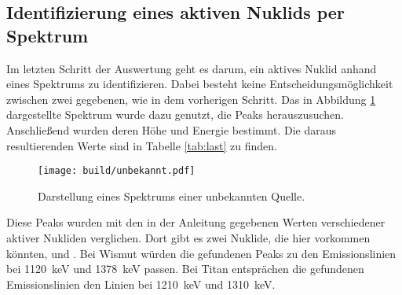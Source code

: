 \subsection{Identifizierung eines aktiven Nuklids per Spektrum}
\label{sec:Nuklidbestimmung}
Im letzten Schritt der Auswertung geht es darum, ein aktives Nuklid anhand eines
Spektrums zu identifizieren. Dabei besteht keine Entscheidungsmöglichkeit zwischen
zwei gegebenen, wie in dem vorherigen Schritt.
Das in Abbildung \ref{plt:unbekannt} dargestellte Spektrum wurde dazu genutzt, die Peaks herauszusuchen.
Anschließend wurden deren Höhe und Energie bestimmt. Die daraus
resultierenden Werte sind in Tabelle \ref{tab:last} zu finden.
\begin{figure}[htb]
  \centering
  \texttt{[image: build/unbekannt.pdf]}
  \caption{Darstellung eines Spektrums einer unbekannten Quelle.}
  \label{plt:unbekannt}
\end{figure}

\FloatBarrier
Diese Peaks wurden mit den in der Anleitung \cite{anleitung} gegebenen Werten
verschiedener aktiver Nukliden verglichen.
Dort gibt es zwei Nuklide, die hier vorkommen könnten,  und
. Bei Wismut würden die gefundenen Peaks zu den Emissionslinien
bei \SI{1120}{\kilo\electronvolt} und \SI{1378}{\kilo\electronvolt} passen. Bei Titan
entsprächen die gefundenen Emissionslinien den Linien bei \SI{1210}{\kilo\electronvolt}
und \SI{1310}{\kilo\electronvolt}.
